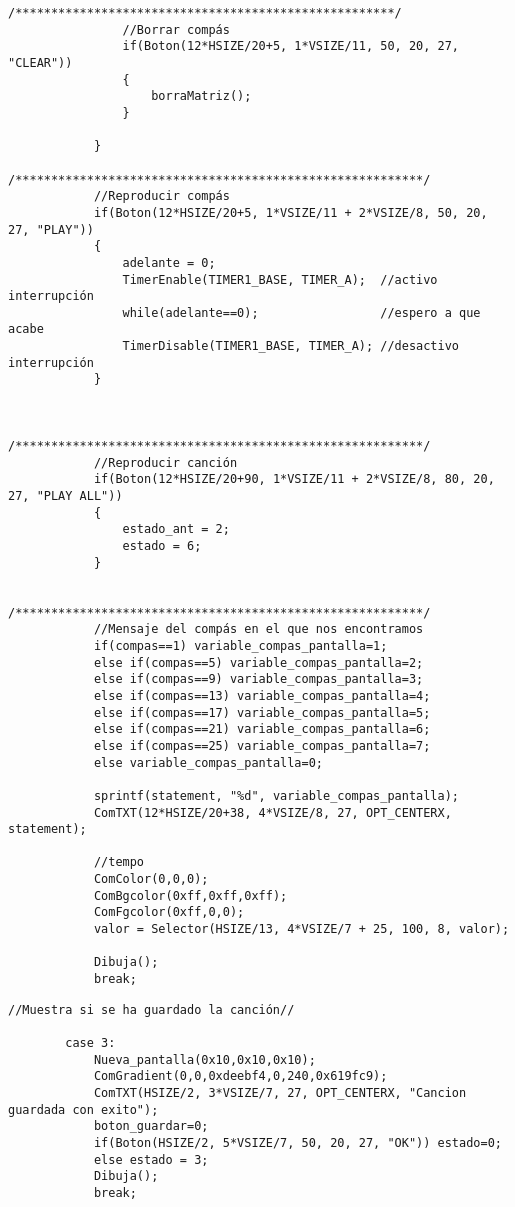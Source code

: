 \documentclass[12pt,a4paper]{article}
\begin{document}
\begin{lstlisting}[basicstyle=\footnotesize]
                /*****************************************************/
                //Borrar compás
                if(Boton(12*HSIZE/20+5, 1*VSIZE/11, 50, 20, 27, "CLEAR"))
                {
                    borraMatriz();
                }

            }
            /*********************************************************/
            //Reproducir compás
            if(Boton(12*HSIZE/20+5, 1*VSIZE/11 + 2*VSIZE/8, 50, 20, 27, "PLAY"))
            {
                adelante = 0;
                TimerEnable(TIMER1_BASE, TIMER_A);  //activo interrupción
                while(adelante==0);                 //espero a que acabe
                TimerDisable(TIMER1_BASE, TIMER_A); //desactivo interrupción
            }


            /*********************************************************/
            //Reproducir canción
            if(Boton(12*HSIZE/20+90, 1*VSIZE/11 + 2*VSIZE/8, 80, 20, 27, "PLAY ALL"))
            {
                estado_ant = 2;
                estado = 6;
            }

            /*********************************************************/
            //Mensaje del compás en el que nos encontramos
            if(compas==1) variable_compas_pantalla=1;
            else if(compas==5) variable_compas_pantalla=2;
            else if(compas==9) variable_compas_pantalla=3;
            else if(compas==13) variable_compas_pantalla=4;
            else if(compas==17) variable_compas_pantalla=5;
            else if(compas==21) variable_compas_pantalla=6;
            else if(compas==25) variable_compas_pantalla=7;
            else variable_compas_pantalla=0;

            sprintf(statement, "%d", variable_compas_pantalla);
            ComTXT(12*HSIZE/20+38, 4*VSIZE/8, 27, OPT_CENTERX, statement);

            //tempo
            ComColor(0,0,0);
            ComBgcolor(0xff,0xff,0xff);
            ComFgcolor(0xff,0,0);
            valor = Selector(HSIZE/13, 4*VSIZE/7 + 25, 100, 8, valor);

            Dibuja();
            break;
\end{lstlisting}

\begin{lstlisting}[basicstyle=\footnotesize] 
            //Muestra si se ha guardado la canción//

        case 3:
            Nueva_pantalla(0x10,0x10,0x10);
            ComGradient(0,0,0xdeebf4,0,240,0x619fc9);
            ComTXT(HSIZE/2, 3*VSIZE/7, 27, OPT_CENTERX, "Cancion guardada con exito");
            boton_guardar=0;
            if(Boton(HSIZE/2, 5*VSIZE/7, 50, 20, 27, "OK")) estado=0;
            else estado = 3;
            Dibuja();
            break;
\end{lstlisting}
\end{document}

